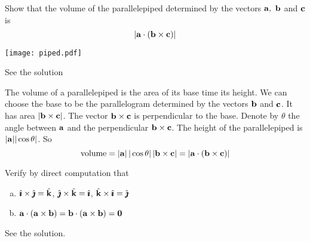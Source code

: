 \begin{question}
Show that the volume of the parallelepiped determined by the
vectors $\mathbf{a},\ \mathbf{b}$ and $\mathbf{c}$ is 
\begin{equation*}
    |\mathbf{a}\cdot(\mathbf{b}\times\mathbf{c})|
\end{equation*}

\begin{center}
     \texttt{[image: piped.pdf]}
\end{center}

\end{question}


\begin{answer}
See the solution
\end{answer}

\begin{solution}
The volume of a parallelepiped is the area of its
base time its height. We can choose the base to be the parallelogram 
determined by the vectors $\mathbf{b}$ and $\mathbf{c}$. It has area $|\mathbf{b}\times\mathbf{c}|$.
The vector $\mathbf{b}\times\mathbf{c}$ is perpendicular to the base. 
%
Denote by
$\theta$ the angle between $\mathbf{a}$ and the perpendicular $\mathbf{b}\times\mathbf{c}$.
The height of the parallelepiped is $|\mathbf{a}| |\cos\theta|$. So 
\begin{equation*}
\text{volume} = |\mathbf{a}|\, |\cos\theta|\, |\mathbf{b}\times\mathbf{c}|
=|\mathbf{a}\cdot(\mathbf{b}\times\mathbf{c})|
\end{equation*}
\end{solution}

\begin{question}
Verify by direct computation that
\begin{enumerate}[(a)]
\item
$\hat{\pmb{\imath}}\times\hat{\pmb{\jmath}}=\hat{\mathbf{k}}$, $\hat{\pmb{\jmath}}\times\hat{\mathbf{k}}=\hat{\pmb{\imath}}$, $\hat{\mathbf{k}}\times\hat{\pmb{\imath}}=\hat{\pmb{\jmath}}$
\item
$\mathbf{a}\cdot(\mathbf{a}\times\mathbf{b})=\mathbf{b}\cdot(\mathbf{a}\times\mathbf{b})=\mathbf{0}$
\end{enumerate}
\end{question}

%

\begin{answer}
See the solution.
\end{answer}

